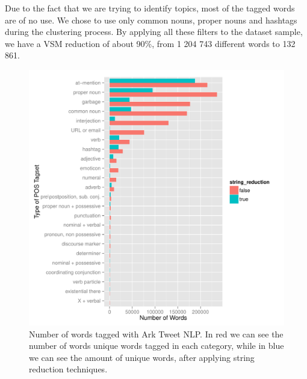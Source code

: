 Due to the fact that we are trying to identify topics, most of the tagged words are of no use. We chose to use only common nouns, proper nouns and hashtags during the clustering process. By applying all these filters to the dataset sample, we have a \ac{VSM} reduction of about 90\%, from 1 204 743 different words to 132 861.

\begin{figure}[htpb]
  \centering
  \includegraphics[width=0.8\linewidth]{./plots/svm/plot_wordcount_nlp.pdf}
  \caption{Number of words tagged with Ark Tweet NLP. In red we can see the number of words unique words tagged in each category, while in blue we can see the amount of unique words, after applying string reduction techniques.}
  \label{fig:wordcount_nlp}
\end{figure}

